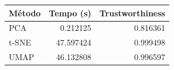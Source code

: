 \begin{tabular}{lrr}
\toprule
Método & Tempo (s) & Trustworthiness \\
\midrule
PCA & 0.212125 & 0.816361 \\
t-SNE & 47.597424 & 0.999498 \\
UMAP & 46.132808 & 0.996597 \\
\bottomrule
\end{tabular}
